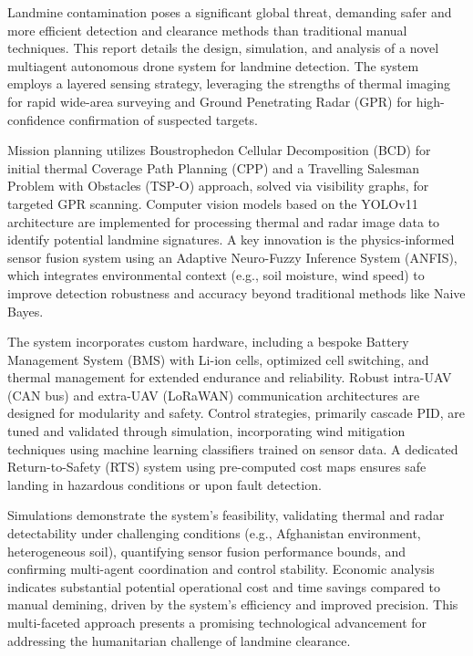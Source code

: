 Landmine contamination poses a significant global threat, demanding safer and more efficient detection and clearance methods than traditional manual techniques. This report details the design, simulation, and analysis of a novel multiagent autonomous drone system for landmine detection. The system employs a layered sensing strategy, leveraging the strengths of thermal imaging for rapid wide-area surveying and Ground Penetrating Radar (GPR) for high-confidence confirmation of suspected targets.

Mission planning utilizes Boustrophedon Cellular Decomposition (BCD) for initial thermal Coverage Path Planning (CPP) and a Travelling Salesman Problem with Obstacles (TSP-O) approach, solved via visibility graphs, for targeted GPR scanning. Computer vision models based on the YOLOv11 architecture are implemented for processing thermal and radar image data to identify potential landmine signatures. A key innovation is the physics-informed sensor fusion system using an Adaptive Neuro-Fuzzy Inference System (ANFIS), which integrates environmental context (e.g., soil moisture, wind speed) to improve detection robustness and accuracy beyond traditional methods like Naive Bayes.

The system incorporates custom hardware, including a bespoke Battery Management System (BMS) with Li-ion cells, optimized cell switching, and thermal management for extended endurance and reliability. Robust intra-UAV (CAN bus) and extra-UAV (LoRaWAN) communication architectures are designed for modularity and safety. Control strategies, primarily cascade PID, are tuned and validated through simulation, incorporating wind mitigation techniques using machine learning classifiers trained on sensor data. A dedicated Return-to-Safety (RTS) system using pre-computed cost maps ensures safe landing in hazardous conditions or upon fault detection.

Simulations demonstrate the system's feasibility, validating thermal and radar detectability under challenging conditions (e.g., Afghanistan environment, heterogeneous soil), quantifying sensor fusion performance bounds, and confirming multi-agent coordination and control stability. Economic analysis indicates substantial potential operational cost and time savings compared to manual demining, driven by the system's efficiency and improved precision. This multi-faceted approach presents a promising technological advancement for addressing the humanitarian challenge of landmine clearance.